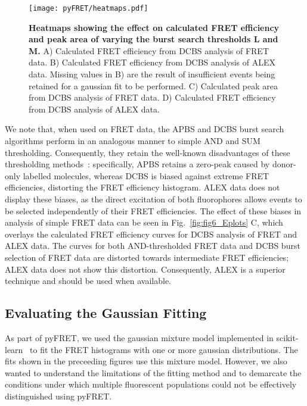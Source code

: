 \begin{figure}[!ht]
   \begin{center}
      \texttt{[image: pyFRET/heatmaps.pdf]}
      \caption{{\bf Heatmaps showing the effect on calculated FRET efficiency and peak area of varying the burst search thresholds L and M.} A) Calculated FRET efficiency from DCBS analysis of FRET data. B) Calculated FRET efficiency from DCBS analysis of ALEX data. Missing values in B) are the result of insufficient events being retained for a gaussian fit to be performed. C) Calculated peak area from DCBS analysis of FRET data. D) Calculated FRET efficiency from DCBS analysis of ALEX data.}
      \label{fig:fig8_heatmaps}
   \end{center}
\end{figure}

We note that, when used on FRET data, the APBS and DCBS burst search algorithms perform in an analogous manner to simple AND and SUM thresholding. Consequently, they retain the well-known disadvantages of these thresholding methods~\cite{murphy14}: specifically, APBS retains a zero-peak caused by donor-only labelled molecules, whereas DCBS is biased against extreme FRET efficiencies, distorting the FRET efficiency histogram. ALEX data does not display these biases, as the direct excitation of both fluorophores allows events to be selected independently of their FRET efficiencies. The effect of these biases in analysis of simple FRET data can be seen in Fig.~\ref{fig:fig6_Eplots} C, which overlays the calculated FRET efficiency curves for DCBS analysis of FRET and ALEX data. The curves for both AND-thresholded FRET data and DCBS burst selection of FRET data are distorted towards intermediate FRET efficiencies; ALEX data does not show this distortion. Consequently, ALEX is a superior technique and should be used when available.

\subsection{Evaluating the Gaussian Fitting}
As part of pyFRET, we used the gaussian mixture model implemented in scikit-learn~\cite{scikit-learn} to fit the FRET histograms with one or more gaussian distributions. The fits shown in the preceeding figures use this mixture model. However, we also wanted to understand the limitations of the fitting method and to demarcate the conditions under which multiple fluorescent populations could not be effectively distinguished using pyFRET. 


